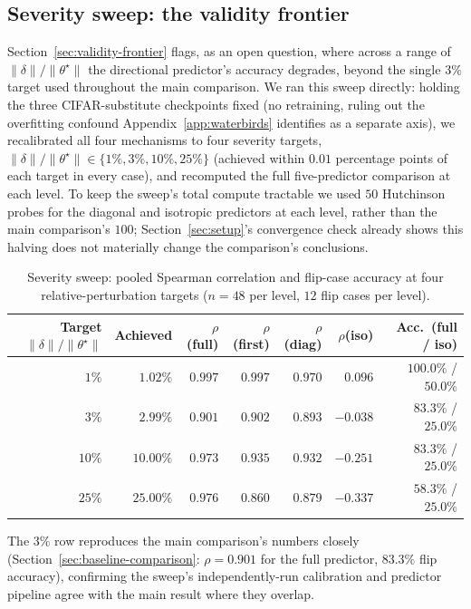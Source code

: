 \documentclass{article}
\newcommand{\theorig}{\theta^\star}
\begin{document}
\subsection{Severity sweep: the validity frontier}
\label{app:severity-sweep}

Section~\ref{sec:validity-frontier} flags, as an open question, where across a range of $\|\delta\|/\|\theorig\|$ the directional predictor's accuracy degrades, beyond the single $3\%$ target used throughout the main comparison. We ran this sweep directly: holding the three CIFAR-substitute checkpoints fixed (no retraining, ruling out the overfitting confound Appendix~\ref{app:waterbirds} identifies as a separate axis), we recalibrated all four mechanisms to four severity targets, $\|\delta\|/\|\theorig\| \in \{1\%, 3\%, 10\%, 25\%\}$ (achieved within $0.01$ percentage points of each target in every case), and recomputed the full five-predictor comparison at each level. To keep the sweep's total compute tractable we used $50$ Hutchinson probes for the diagonal and isotropic predictors at each level, rather than the main comparison's $100$; Section~\ref{sec:setup}'s convergence check already shows this halving does not materially change the comparison's conclusions.

\begin{table}[h]
\centering
\caption{Severity sweep: pooled Spearman correlation and flip-case accuracy at four relative-perturbation targets ($n=48$ per level, $12$ flip cases per level).}
\label{tab:severity-sweep}
\begin{tabular}{@{}rrrrrrr@{}}
\toprule
Target $\|\delta\|/\|\theorig\|$ & Achieved & $\rho$(full) & $\rho$(first) & $\rho$(diag) & $\rho$(iso) & Acc.\ (full / iso) \\
\midrule
$1\%$  & $1.02\%$  & $0.997$ & $0.997$ & $0.970$ & $0.096$  & $100.0\%$ / $50.0\%$ \\
$3\%$  & $2.99\%$  & $0.901$ & $0.902$ & $0.893$ & $-0.038$ & $83.3\%$ / $25.0\%$ \\
$10\%$ & $10.00\%$ & $0.973$ & $0.935$ & $0.932$ & $-0.251$ & $83.3\%$ / $25.0\%$ \\
$25\%$ & $25.00\%$ & $0.976$ & $0.860$ & $0.879$ & $-0.337$ & $58.3\%$ / $25.0\%$ \\
\bottomrule
\end{tabular}
\end{table}

The $3\%$ row reproduces the main comparison's numbers closely (Section~\ref{sec:baseline-comparison}: $\rho=0.901$ for the full predictor, $83.3\%$ flip accuracy), confirming the sweep's independently-run calibration and predictor pipeline agree with the main result where they overlap.
\end{document}
